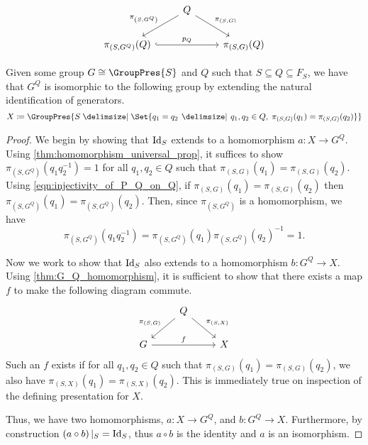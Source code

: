 \begin{equation}
	\begin{tikzcd}
		& Q \ar[dl, "\pi_{\left(S,G^Q\right)}"'] \ar[dr, "\pi_{\left(S,G\right)}"] &
		\\ \pi_{\left( S,G^Q \right)} (Q) \ar[rr, hook, "p_Q"]  & & \pi_{\left( S,G \right)}(Q)
	\end{tikzcd}
	\label{eqn:injectivity_of_P_Q_on_Q}
\end{equation}

\begin{theorem}
	Given some group $G \cong \GroupPres{S}$ and $Q$ such that $S \subseteq Q \subseteq F_S$, we have that $G^Q$ is isomorphic to the following group by extending the natural identification of generators.
	\begin{equation}
		X \coloneqq \GroupPres{S \relations \Set{q_1 = q_2 \given q_1,q_2 \in Q, \; \pi_{(S,G) }(q_1) = \pi_{(S,G)}(q_2)}}
	\end{equation}
\end{theorem}

\begin{proof}
	We begin by showing that $\operatorname{Id}_S$ extends to a homomorphism $a \colon X \to G^Q$.
	Using \cref{thm:homomorphism_universal_prop}, it suffices to show $\pi_{\left(S,G^Q\right)}(q_1q_2^{-1}) = 1$ for all $q_1,q_2 \in Q$ such that $\pi_{(S,G)}(q_1) = \pi_{(S,G)}(q_2)$.
	Using \eqref{eqn:injectivity_of_P_Q_on_Q}, if $\pi_{(S,G)}(q_1) = \pi_{(S,G)}(q_2)$ then $\pi_{\left(S,G^Q\right)}(q_1) = \pi_{\left(S,G^Q\right)}(q_2)$.
	Then, since $\pi_{\left(S,G^Q\right)}$ is a homomorphism, we have
	\[
		\pi_{(S,G^Q)}\left(q_1q_2^{-1}\right) = \pi_{(S,G^Q)}(q_1)\pi_{(S,G^Q)}(q_2)^{-1} = 1
		.\]

	Now we work to show that $\operatorname{Id}_S$ also extends to a homomorphism $b \colon G^Q \to X$.
	Using \cref{thm:G_Q_homomorphism}, it is sufficient to show that there exists a map $f$ to make the following diagram commute.
	\begin{equation*}
		\begin{tikzcd}
			& Q \ar[dl, "\pi_{(S,G)}"'] \ar[dr, "\pi_{(S,X)}"] &
			\\ G \ar[rr, "f"] & & X
		\end{tikzcd}
	\end{equation*}
	Such an $f$ exists if for all $q_1,q_2 \in Q$ such that $\pi_{\left( S,G \right)} (q_1) = \pi_{\left( S,G \right)} (q_2)$, we also have $\pi_{\left( S,X \right) }(q_1) = \pi_{\left( S,X \right) }(q_2)$.
	This is immediately true on inspection of the defining presentation for $X$.

	Thus, we have two homomorphisms, $a \colon X \to G^Q$, and $b \colon G^Q \to X$.
	Furthermore, by construction $\left( a \circ b \right) |_S = \operatorname{Id}_S$, thus $a \circ b$ is the identity and $a$ is an isomorphism.
\end{proof}

